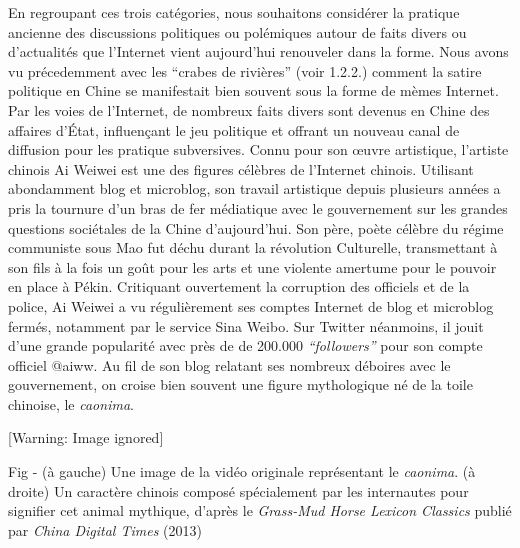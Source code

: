 \textcolor[rgb]{0.0,0.0,0.039215688}{En regroupant ces trois
cat\'egories, nous souhaitons consid\'erer la pratique ancienne des
discussions politiques ou pol\'emiques autour de faits divers ou
d{\textquoteright}actualit\'es que l{\textquoteright}Internet vient
aujourd{\textquoteright}hui renouveler dans la forme. Nous avons vu
pr\'ecedemment avec les {\textquotedblleft}crabes de
rivi\`eres{\textquotedblright} }(voir 1.2.2.)
\textcolor[rgb]{0.0,0.0,0.039215688}{comment la satire politique en
Chine se manifestait bien souvent sous la forme de m\`emes Internet.
Par les voies de l{\textquoteright}Internet, }de nombreux faits divers
sont devenus en Chine des affaires d{\textquoteright}\'Etat,
influen\c{c}ant le jeu politique et offrant un nouveau canal de
diffusion pour les pratique subversives. Connu pour son {\oe}uvre
artistique, l{\textquoteright}artiste chinois Ai Weiwei est une des
figures c\'el\`ebres de l{\textquoteright}Internet chinois. Utilisant
abondamment blog et microblog, son travail artistique depuis plusieurs
ann\'ees a pris la tournure d{\textquoteright}un bras de fer
m\'ediatique avec le gouvernement sur les grandes questions
soci\'etales de la Chine d{\textquoteright}aujourd{\textquoteright}hui.
Son p\`ere, po\`ete c\'el\`ebre du r\'egime communiste sous Mao fut
d\'echu durant la r\'evolution Culturelle, transmettant \`a son fils
\`a la fois un go\^ut pour les arts et une violente amertume pour le
pouvoir en place \`a P\'ekin. Critiquant ouvertement la corruption des
officiels et de la police, Ai Weiwei a vu r\'eguli\`erement ses comptes
Internet de blog et microblog ferm\'es, notamment par le service Sina
Weibo. Sur Twitter n\'eanmoins, il jouit d{\textquoteright}une grande
popularit\'e avec pr\`es de de 200.000
\textit{{\textquotedblleft}followers{\textquotedblright}} pour son
compte officiel @aiww. Au fil de son blog relatant ses nombreux
d\'eboires avec le gouvernement, on croise bien souvent une figure
mythologique n\'e de la toile chinoise, le \textit{caonima}. 

{%
   [Warning: Image ignored] %
 \par}

Fig - (\`a gauche) Une image de la vid\'eo originale repr\'esentant le
\textit{caonima}. (\`a droite) Un caract\`ere chinois compos\'e
sp\'ecialement par les internautes pour signifier cet animal mythique,
d{\textquoteright}apr\`es le \textit{Grass-Mud Horse Lexicon Classics
}publi\'e par \textit{China Digital Times }(2013)

